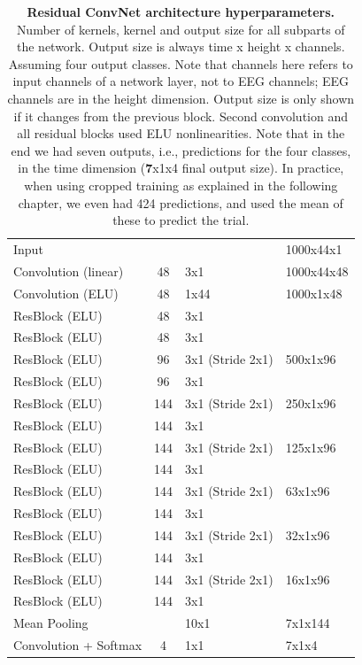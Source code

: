 \begin{table}[ht]
    \small
    \myfloatalign
    \begin{tabularx}{\textwidth}{lS[table-format=3.0]ll} 
    \toprule
         & 
        &  &  \\ 
    \midrule
    Input & & & 1000x44x1 \\
    Convolution (linear) & 48 & 3x1 & 1000x44x48 \\
    Convolution (ELU) & 48 & 1x44 & 1000x1x48 \\
    ResBlock (ELU) & 48 & 3x1 & \\
    ResBlock (ELU) & 48 & 3x1 & \\
    ResBlock (ELU) & 96 & 3x1 (Stride 2x1) & 500x1x96 \\
    ResBlock (ELU) & 96 & 3x1 & \\
    ResBlock (ELU) & 144 & 3x1 (Stride 2x1) & 250x1x96 \\
    ResBlock (ELU) & 144 & 3x1 & \\
    ResBlock (ELU) & 144 & 3x1 (Stride 2x1) & 125x1x96 \\
    ResBlock (ELU) & 144 & 3x1 & \\
    ResBlock (ELU) & 144 & 3x1 (Stride 2x1) & 63x1x96 \\
    ResBlock (ELU) & 144 & 3x1 & \\
    ResBlock (ELU) & 144 & 3x1 (Stride 2x1) & 32x1x96 \\
    ResBlock (ELU) & 144 & 3x1 & \\
    ResBlock (ELU) & 144 & 3x1 (Stride 2x1) & 16x1x96 \\
    ResBlock (ELU) & 144 & 3x1 & \\
    Mean Pooling & & 10x1 & 7x1x144 \\
    Convolution + Softmax & 4 & 1x1 & 7x1x4 \\
        \bottomrule
    \end{tabularx}
    \caption[Residual ConvNet architecture hyperparameters.]{\textbf{Residual ConvNet architecture hyperparameters.}
Number of kernels, kernel and output size for all subparts of the
network. Output size is always time x height x channels. Assuming four output classes. Note that
channels here refers to input channels of a network layer, not to EEG
channels; EEG channels are in the height dimension. Output size is only
shown if it changes from the previous block. Second convolution and all
residual blocks used ELU nonlinearities. Note that in the end we had
seven outputs, i.e., predictions for the four classes, in the time
dimension (\textbf{7}x1x4 final output size). In practice, when using
cropped training as explained in the following chapter, we even had 424
predictions, and used the mean of these to predict the trial.}  
\label{residual-architectures-table}
\end{table}

